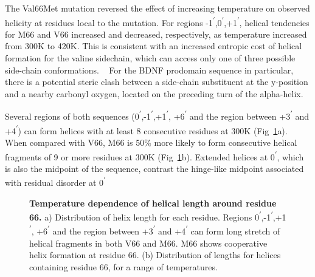 \documentclass[10pt,letterpaper]{article}
\begin{document}
The Val66Met mutation reversed the effect of increasing temperature on observed helicity at residues local to the mutation. For regions -1\textsuperscript{$\prime$},0\textsuperscript{$\prime$},+1\textsuperscript{$\prime$}, helical tendencies for M66 and V66 increased and decreased, respectively, as temperature increased from 300K to 420K.  This is consistent with an increased entropic cost of helical formation for the valine sidechain, which can access only one of three possible side-chain conformations. ~\cite {Creamer1992} For the BDNF prodomain 
 sequence in particular, there is a potential steric clash between a side-chain substituent at the y-position and a nearby carbonyl oxygen, located on the preceding turn of the alpha-helix.



Several regions of both sequences (0\textsuperscript{$\prime$},-1\textsuperscript{$\prime$},+1\textsuperscript{$\prime$}, +6\textsuperscript{$\prime$} and the region between +3\textsuperscript{$\prime$} and +4\textsuperscript{$\prime$})
can form helices with at least 8 consecutive residues at 300K (Fig~\ref{fig3}a). 
When compared with V66, M66 is 50\%
more likely to form consecutive helical fragments of 9 or more residues at 300K (Fig~\ref{fig3}b). 
Extended helices at 0\textsuperscript{$\prime$}, which is also the midpoint of the sequence, contrast the hinge-like midpoint associated with residual disorder at 0\textsuperscript{$\prime$}

\begin{figure}[!ht]

\caption{{\bf Temperature dependence of helical length around residue 66.} %
a) Distribution of helix length for each residue. Regions 0\textsuperscript{$\prime$},-1\textsuperscript{$\prime$},+1\textsuperscript{$\prime$}, +6\textsuperscript{$\prime$} and the region between +3\textsuperscript{$\prime$} and +4\textsuperscript{$\prime$} can form long stretch of helical fragments in both V66 and M66. M66 shows cooperative helix formation at residue 66.   (b) Distribution of lengths for helices containing residue 66, for a range of temperatures. 
}
\label{fig3} 
\end{figure}
\end{document}
